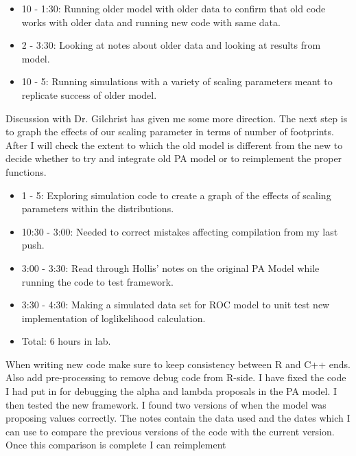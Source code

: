 \documentclass[12pt,hyperref]{labbook}
\begin{document}
\begin{itemize}
    \item 10 - 1:30: Running older model with older data to confirm that old code works with older data and running new code with same data.
    \item 2 - 3:30: Looking at notes about older data and looking at results from model.
\end{itemize}
\begin{itemize}
    \item 10 - 5: Running simulations with a variety of scaling parameters meant to replicate success of older model.
\end{itemize}
Discussion with Dr. Gilchrist has given me some more direction. The next step is to graph the effects of our scaling parameter in terms of 
number of footprints. After I will check the extent to which the old model is different from the new to decide whether to try and integrate 
old PA model or to reimplement the proper functions. 
\begin{itemize}
    \item 1 - 5: Exploring simulation code to create a graph of the effects of scaling parameters within the distributions.
\end{itemize}
\begin{itemize}
 \item 10:30 - 3:00: Needed to correct mistakes affecting compilation from my last push. 
 \item 3:00 - 3:30: Read through Hollis' notes on the original PA Model while running the code to test framework.
 \item 3:30 - 4:30: Making a simulated data set for ROC model to unit test new implementation of loglikelihood calculation.
 \item Total: 6 hours in lab.
\end{itemize}
When writing new code make sure to keep consistency between R and C++ ends. Also add pre-processing to remove debug code from R-side.
I have fixed the code I had put in for debugging the alpha and lambda proposals in the PA model. I then tested the new framework.
I found two versions of when the model was proposing values correctly. The notes contain the data used and the dates which I
can use to compare the previous versions of the code with the current version. Once this comparison is complete I can reimplement
\end{document}

